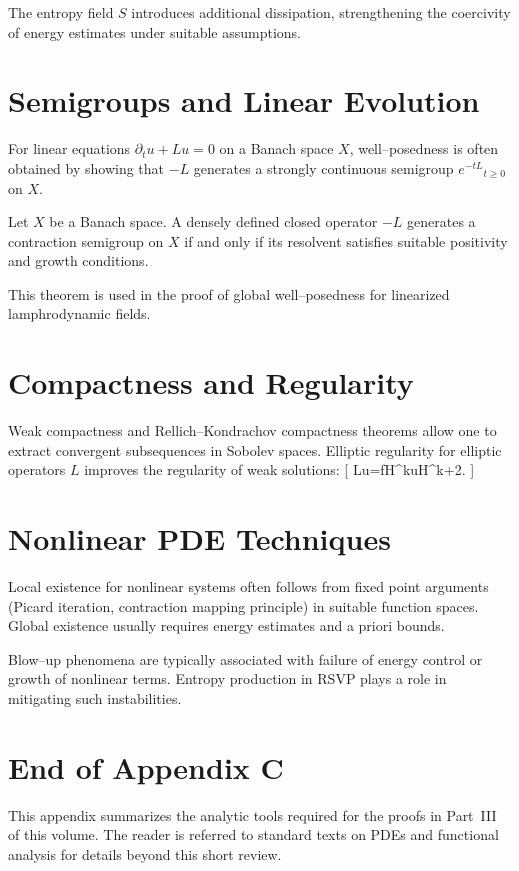 \begin{remark}
The entropy field $S$ introduces additional dissipation, strengthening the coercivity of energy estimates under suitable assumptions.
\end{remark}

\section{Semigroups and Linear Evolution}

For linear equations $\partial_t u+Lu=0$ on a Banach space $X$, well--posedness is often obtained by showing that $-L$ generates a strongly continuous semigroup ${e^{-tL}}_{t\ge0}$ on $X$.

\begin{theorem}
Let $X$ be a Banach space.  A densely defined closed operator $-L$ generates a contraction semigroup on $X$ if and only if its resolvent satisfies suitable positivity and growth conditions.
\end{theorem}

This theorem is used in the proof of global well--posedness for linearized lamphrodynamic fields.

\section{Compactness and Regularity}

Weak compactness and Rellich--Kondrachov compactness theorems allow one to extract convergent subsequences in Sobolev spaces. Elliptic regularity for elliptic operators $L$ improves the regularity of weak solutions:
[
Lu=f\in H^k\quad\Rightarrow\quad u\in H^{k+2}.
]

\section{Nonlinear PDE Techniques}

Local existence for nonlinear systems often follows from fixed point arguments (Picard iteration, contraction mapping principle) in suitable function spaces. Global existence usually requires energy estimates and a priori bounds.

\begin{remark}
Blow--up phenomena are typically associated with failure of energy control or growth of nonlinear terms. Entropy production in RSVP plays a role in mitigating such instabilities.
\end{remark}

\section{End of Appendix C}

This appendix summarizes the analytic tools required for the proofs in Part~III of this volume.  The reader is referred to standard texts on PDEs and functional analysis for details beyond this short review.


